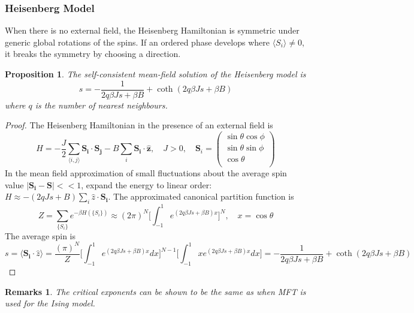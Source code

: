 \documentclass[a4paper]{article}
\newtheorem{remarks}{Remarks}[section]
\theoremstyle{new}
\newtheorem{prop}{Proposition}[section]
\begin{document}
\subsubsection{Heisenberg Model}
When there is no external field, the Heisenberg Hamiltonian is symmetric under generic global rotations of the spins. If an ordered phase develops where $\langle S_i\rangle\neq 0$, it breaks the symmetry by choosing a direction. 
\begin{prop}
The self-consistent mean-field solution of the Heisenberg model is
$$s=-\frac{1}{2q\beta Js+\beta B}+\coth(2q\beta Js+\beta B)$$
where $q$ is the number of nearest neighbours.
\end{prop}
\begin{proof}
The Heisenberg Hamiltonian in the presence of an external field is
$$H=-\frac{J}{2}\sum_{\langle i,j\rangle}\mathbf{S_i}\cdot\mathbf{S_j}-B\sum_i\mathbf{S_i}\cdot\mathbf{\hat{z}},\quad J>0,\quad\mathbf{S}_i=\begin{pmatrix}\sin\theta\cos\phi\\\sin\theta\sin\phi\\\cos\theta\\\end{pmatrix}$$
In the mean field approximation of small fluctuations about the average spin value $|\mathbf{S_i}-\mathbf{S}|<<1$, expand the energy to linear order: $H\approx-(2qJs+B)\sum_i\hat{z}\cdot\mathbf{S_i}$. The approximated canonical partition function is
$$Z=\sum_{\{S_i\}}e^{-\beta H(\{S_i\})}\approx (2\pi)^N\bigg[\int_{-1}^1 e^{(2q\beta Js+\beta B)x}\bigg]^N,\quad x=\cos\theta$$
The average spin is
$$s=\langle\mathbf{S_i}\cdot\hat{z}\rangle=\frac{(\pi)^N}{Z}\bigg[\int_{-1}^1e^{(2q\beta Js+\beta B)x}dx\bigg]^{N-1}\bigg[\int_{-1}^1xe^{(2q\beta Js+\beta B)x}dx\bigg]=-\frac{1}{2q\beta Js+\beta B}+\coth(2q\beta Js+\beta B)$$
\end{proof}
\begin{remarks}
The critical exponents can be shown to be the same as when MFT is used for the Ising model.
\end{remarks}
\end{document}
